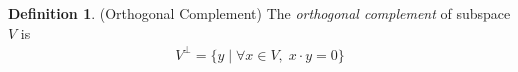 \documentclass[12pt]{article}
\numberwithin{equation}{section} %
\theoremstyle{plain}
\newtheorem{prop}[thm]{Proposition}
\theoremstyle{definition}
\newtheorem{defn}[thm]{Definition}
\theoremstyle{remark}
\newcommand{\R}{\mathbb{R}}
\newcommand{\Rn}{\mathbb{R}^n}
\newcommand{\Rm}{\mathbb{R}^m}
\newcommand{\nul}{\operatorname{null}}
\newcommand{\range}{\operatorname{range}}
\begin{document}
\begin{defn}(Orthogonal Complement)
The \emph{orthogonal complement} of subspace $V$ is
\begin{align*}
  V^\perp = \{ y\; | \; \forall x\in V,\; x\cdot y=0\}
\end{align*}
\end{defn}


\end{document}
